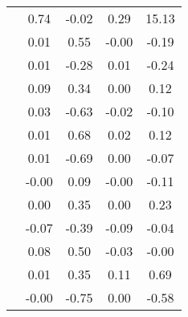 \begin{table}
\begin{tabular}{c|cc|cc|}
\multicolumn{1}{|c|}{} & \multicolumn{1}{|c|}{      0.74} & \multicolumn{1}{|c|}{     -0.02} & \multicolumn{1}{|c|}{      0.29} & \multicolumn{1}{|c|}{     15.13} \\ 
\multicolumn{1}{|c|}{} & \multicolumn{1}{|c|}{      0.01} & \multicolumn{1}{|c|}{      0.55} & \multicolumn{1}{|c|}{     -0.00} & \multicolumn{1}{|c|}{     -0.19} \\ 
\multicolumn{1}{|c|}{} & \multicolumn{1}{|c|}{      0.01} & \multicolumn{1}{|c|}{     -0.28} & \multicolumn{1}{|c|}{      0.01} & \multicolumn{1}{|c|}{     -0.24} \\ 
\multicolumn{1}{|c|}{} & \multicolumn{1}{|c|}{      0.09} & \multicolumn{1}{|c|}{      0.34} & \multicolumn{1}{|c|}{      0.00} & \multicolumn{1}{|c|}{      0.12} \\ 
\multicolumn{1}{|c|}{} & \multicolumn{1}{|c|}{      0.03} & \multicolumn{1}{|c|}{     -0.63} & \multicolumn{1}{|c|}{     -0.02} & \multicolumn{1}{|c|}{     -0.10} \\ 
\multicolumn{1}{|c|}{} & \multicolumn{1}{|c|}{      0.01} & \multicolumn{1}{|c|}{      0.68} & \multicolumn{1}{|c|}{      0.02} & \multicolumn{1}{|c|}{      0.12} \\ 
\multicolumn{1}{|c|}{} & \multicolumn{1}{|c|}{      0.01} & \multicolumn{1}{|c|}{     -0.69} & \multicolumn{1}{|c|}{      0.00} & \multicolumn{1}{|c|}{     -0.07} \\ 
\multicolumn{1}{|c|}{} & \multicolumn{1}{|c|}{     -0.00} & \multicolumn{1}{|c|}{      0.09} & \multicolumn{1}{|c|}{     -0.00} & \multicolumn{1}{|c|}{     -0.11} \\ 
\multicolumn{1}{|c|}{} & \multicolumn{1}{|c|}{      0.00} & \multicolumn{1}{|c|}{      0.35} & \multicolumn{1}{|c|}{      0.00} & \multicolumn{1}{|c|}{      0.23} \\ 
\multicolumn{1}{|c|}{} & \multicolumn{1}{|c|}{     -0.07} & \multicolumn{1}{|c|}{     -0.39} & \multicolumn{1}{|c|}{     -0.09} & \multicolumn{1}{|c|}{     -0.04} \\ 
\multicolumn{1}{|c|}{} & \multicolumn{1}{|c|}{      0.08} & \multicolumn{1}{|c|}{      0.50} & \multicolumn{1}{|c|}{     -0.03} & \multicolumn{1}{|c|}{     -0.00} \\ 
\multicolumn{1}{|c|}{} & \multicolumn{1}{|c|}{      0.01} & \multicolumn{1}{|c|}{      0.35} & \multicolumn{1}{|c|}{      0.11} & \multicolumn{1}{|c|}{      0.69} \\ 
\multicolumn{1}{|c|}{} & \multicolumn{1}{|c|}{     -0.00} & \multicolumn{1}{|c|}{     -0.75} & \multicolumn{1}{|c|}{      0.00} & \multicolumn{1}{|c|}{     -0.58} \\ 

\end{tabular}
\end{table}
